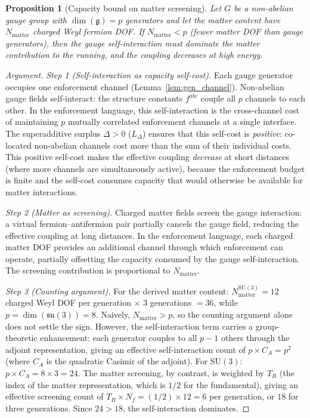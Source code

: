 \documentclass[11pt,a4paper]{article}
\newtheorem{proposition}[theorem]{Proposition}
\theoremstyle{definition}
\newcommand{\SU}{\mathrm{SU}}
\begin{document}
\begin{proposition}[Capacity bound on matter screening]%
\label{prop:AF_capacity_bound}
Let $G$ be a non-abelian gauge group with $\dim(\mathfrak{g}) = p$
generators and let the matter content have $N_{\mathrm{matter}}$
charged Weyl fermion DOF.  If
$N_{\mathrm{matter}} < p$ (fewer matter DOF than gauge generators),
then the gauge self-interaction must dominate the matter contribution
to the running, and the coupling decreases at high energy.
\end{proposition}

\begin{proof}[Argument]
\textit{Step 1 (Self-interaction as capacity self-cost).}\quad
Each gauge generator occupies one enforcement channel
(Lemma~\ref{lem:gen_channel}).  Non-abelian gauge fields
self-interact: the structure constants $f^{abc}$ couple all $p$
channels to each other.  In the enforcement language, this
self-interaction is the cross-channel cost of maintaining $p$
mutually correlated enforcement channels at a single interface.  The
superadditive surplus $\Delta > 0$ ($L_\Delta$) ensures that this
self-cost is \emph{positive}: co-located non-abelian channels cost
more than the sum of their individual costs.  This positive
self-cost makes the effective coupling \emph{decrease} at short
distances (where more channels are simultaneously active), because
the enforcement budget is finite and the self-cost consumes capacity
that would otherwise be available for matter interactions.

\textit{Step 2 (Matter as screening).}\quad
Charged matter fields screen the gauge interaction: a virtual
fermion--antifermion pair partially cancels the gauge field,
reducing the effective coupling at long distances.  In the
enforcement language, each charged matter DOF provides an
additional channel through which enforcement can operate, partially
offsetting the capacity consumed by the gauge self-interaction.  The
screening contribution is proportional to $N_{\mathrm{matter}}$.

\textit{Step 3 (Counting argument).}\quad
For the derived matter content:
$N_{\mathrm{matter}}^{\SU(3)} = 12$ charged Weyl DOF per generation
$\times$ 3 generations $= 36$, while $p = \dim(\mathfrak{su}(3)) = 8$.
Naively, $N_{\mathrm{matter}} > p$, so the counting argument alone
does not settle the sign.  However, the self-interaction term carries
a group-theoretic enhancement: each generator couples to all $p - 1$
others through the adjoint representation, giving an effective
self-interaction count of $p \times C_A = p^2$ (where $C_A$ is the
quadratic Casimir of the adjoint).  For $\SU(3)$:
$p \times C_A = 8 \times 3 = 24$.  The matter screening, by contrast,
is weighted by $T_R$ (the index of the matter representation, which is
$1/2$ for the fundamental), giving an effective screening count of
$T_R \times N_f = (1/2) \times 12 = 6$ per generation, or $18$ for
three generations.  Since $24 > 18$, the self-interaction dominates.
\end{proof}
\end{document}
